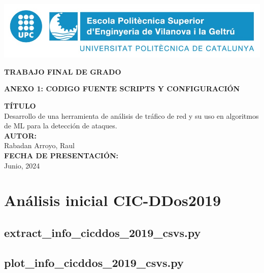 \documentclass[11pt]{report}
\begin{document}
\nocite{*}



\begin{titlepage}
    \begin{center}
        \includegraphics{media/epsevg_logo.jpeg}

        \vspace{1.5cm}
        {\Huge\textbf{TRABAJO FINAL DE GRADO}}

        \vfill
        {\Large\textbf{ANEXO 1: CODIGO FUENTE SCRIPTS Y CONFIGURACIÓN}}

        \vfill
        \textbf{TÍTULO} \\  	Desarrollo de una herramienta de análisis de tráfico de red y su uso en algoritmos de ML para la detección de ataques.
        \\[\baselineskip]
        \textbf{AUTOR:} \\ Rabadan Arroyo, Raul 
        \\[\baselineskip]
        \textbf{FECHA DE PRESENTACIÓN:} \\ Junio, 2024
        \vfill

    \end{center}
\end{titlepage}

\tableofcontents
\newpage

\chapter{Análisis inicial CIC-DDos2019}
\section{extract\_info\_cicddos\_2019\_csvs.py}


\section{plot\_info\_cicddos\_2019\_csvs.py}

\end{document}
